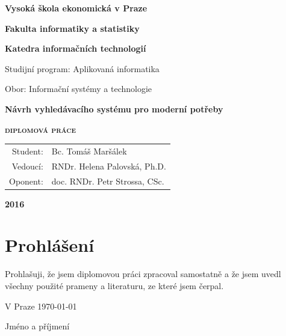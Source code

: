 \documentclass[11pt,letterpaper,oneside,openright]{book}
\begin{document}
\frontmatter

\begin{titlepage}
\thispagestyle{empty}
\centering
\begingroup
{\LARGE\bfseries Vysoká škola ekonomická v Praze\par}
{\Large\bfseries Fakulta informatiky a statistiky\par}
{\Large\bfseries Katedra informačních technologií\par}
\vspace{1.8cm}
{\large Studijní program: Aplikovaná informatika\par}
\vspace{.2em}
{\large Obor: Informační systémy a technologie\par}
\vspace{1.8cm}
{\Huge\bfseries Návrh vyhledávacího systému pro moderní potřeby\par}
\vspace{.5cm}
{\scshape\LARGE\bfseries diplomová práce\par}
\vspace{4.2cm}
\def\arraystretch{1.6}
\begin{tabular}{rl}
{\Large Student:} & {\Large Bc. Tomáš Maršálek \par} \\
{\Large Vedoucí:} & {\Large RNDr. Helena Palovská, Ph.D. \par} \\
{\Large Oponent:} & {\Large doc. RNDr. Petr Strossa, CSc. \par} \\
\end{tabular}
\par
\vspace{4cm}
{\Large\bfseries 2016\par}
\vfill
\endgroup
\end{titlepage}

\newpage
\chapter*{Prohlášení}
\noindent Prohlašuji, že jsem diplomovou práci zpracoval samostatně a že jsem uvedl
všechny použité prameny a literaturu, ze které jsem čerpal.\par
\vspace{2.4cm}
\noindent V Praze \today \hfill \dotfill \hspace{2em} \par
\hfill \strut Jméno a příjmení \hspace{3.5em} \strut
\end{document}
